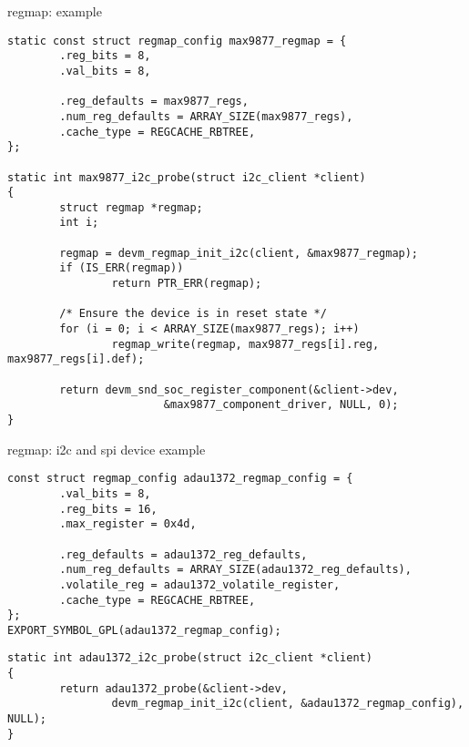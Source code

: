 \begin{frame}[fragile]{regmap: example}
  \begin{block}{}
  \fontsize{8}{8}\selectfont
    \begin{verbatim}
static const struct regmap_config max9877_regmap = {
        .reg_bits = 8,
        .val_bits = 8,

        .reg_defaults = max9877_regs,
        .num_reg_defaults = ARRAY_SIZE(max9877_regs),
        .cache_type = REGCACHE_RBTREE,
};

static int max9877_i2c_probe(struct i2c_client *client)
{
        struct regmap *regmap;
        int i;

        regmap = devm_regmap_init_i2c(client, &max9877_regmap);
        if (IS_ERR(regmap))
                return PTR_ERR(regmap);

        /* Ensure the device is in reset state */
        for (i = 0; i < ARRAY_SIZE(max9877_regs); i++)
                regmap_write(regmap, max9877_regs[i].reg, max9877_regs[i].def);

        return devm_snd_soc_register_component(&client->dev,
                        &max9877_component_driver, NULL, 0);
}
    \end{verbatim}
  \end{block}
\end{frame}

\begin{frame}[fragile]{regmap: i2c and spi device example}
  \begin{block}{}
  \fontsize{8}{8}\selectfont
    \begin{verbatim}
const struct regmap_config adau1372_regmap_config = {
        .val_bits = 8,
        .reg_bits = 16,
        .max_register = 0x4d,

        .reg_defaults = adau1372_reg_defaults,
        .num_reg_defaults = ARRAY_SIZE(adau1372_reg_defaults),
        .volatile_reg = adau1372_volatile_register,
        .cache_type = REGCACHE_RBTREE,
};
EXPORT_SYMBOL_GPL(adau1372_regmap_config);
    \end{verbatim}
  \end{block}
  \begin{block}{}
  \fontsize{8}{8}\selectfont
    \begin{verbatim}
static int adau1372_i2c_probe(struct i2c_client *client)
{
        return adau1372_probe(&client->dev,
                devm_regmap_init_i2c(client, &adau1372_regmap_config), NULL);
}
    \end{verbatim}
  \end{block}
\end{frame}

